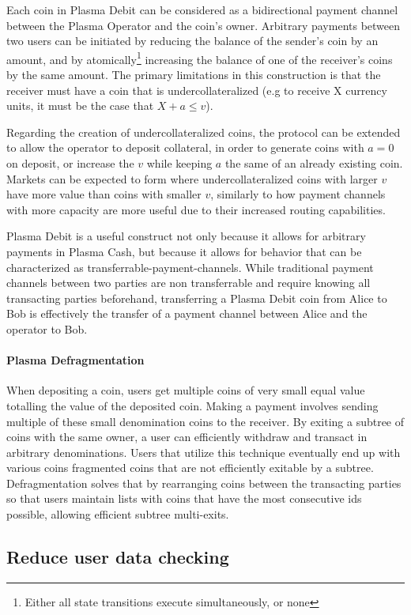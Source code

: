 Each coin in Plasma Debit can be considered as a bidirectional payment channel
between the Plasma Operator and the coin's owner. Arbitrary payments between two
users can be initiated by reducing the balance of the sender's coin by an
amount, and by atomically\footnote{Either all state transitions execute simultaneously, or none} increasing the balance of one of the receiver's coins
by the same amount. The primary limitations in this construction is that the
receiver must have a coin that is undercollateralized (e.g to receive X currency units, it must be the case that $X + a \leq v$). 

Regarding the creation of undercollateralized coins, the protocol can be
extended to allow the operator to deposit collateral, in order to
generate coins with $a = 0$ on deposit, or increase the $v$ while keeping $a$ the same of an already existing coin. Markets can be expected to form where undercollateralized coins with
larger $v$ have more value than coins with smaller $v$, similarly to how
payment channels with more capacity are more useful due to their increased
routing capabilities.

Plasma Debit is a useful construct not only because it allows for arbitrary
payments in Plasma Cash, but because it allows for behavior that can be
characterized as transferrable-payment-channels. While traditional payment
channels between two parties are non transferrable and require knowing all
transacting parties beforehand, transferring a Plasma Debit coin from Alice to Bob is
effectively the transfer of a payment channel between Alice and the operator to
Bob.

\paragraph{Plasma Defragmentation} When depositing a coin, users get multiple coins of very small equal value totalling the value of the deposited coin. Making a payment involves sending multiple of these small denomination coins to the receiver. By exiting a subtree of coins with the same owner, a user can efficiently withdraw and transact in arbitrary denominations. Users that utilize this technique eventually end up with various coins fragmented coins that are not efficiently exitable by a subtree. Defragmentation solves that by rearranging coins between the transacting parties so that users maintain lists with coins that have the most consecutive ids possible, allowing efficient subtree multi-exits.

\subsection{Reduce user data checking}

